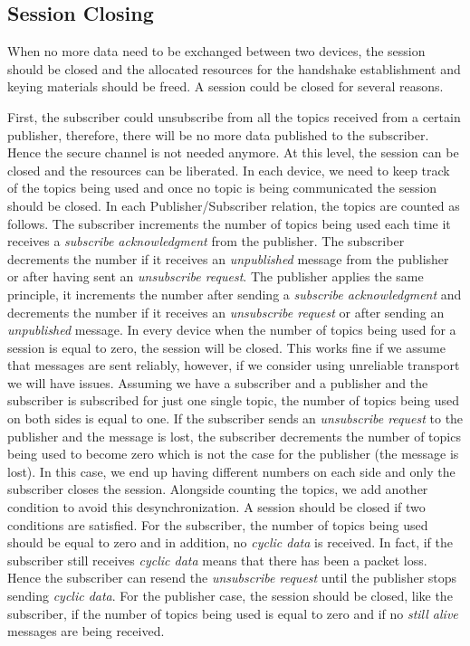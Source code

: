 \subsection{Session Closing}

When no more data need to be exchanged between two devices, the session should be closed and the allocated resources
for the handshake establishment and keying materials should be freed. A session could be closed for several reasons.

First, the subscriber could unsubscribe from all the topics received from a certain publisher, therefore, there will be no more
data published to the subscriber. Hence the secure channel is not needed anymore. At this level, the session can be closed and
the resources can be liberated. In each device, we need to keep track of the topics being used and once no topic is being communicated
the session should be closed. In each Publisher/Subscriber relation, the topics are counted as follows. The subscriber increments
the number of topics being used each time it receives a \textit{subscribe acknowledgment} from the publisher. The subscriber decrements the number
if it receives an \textit{unpublished} message from the publisher or after having sent an \textit{unsubscribe request}. The publisher applies
the same principle, it increments the number after sending a \textit{subscribe acknowledgment} and decrements the number if it receives
an \textit{unsubscribe request} or after sending an \textit{unpublished} message. In every device when the number of topics being used for a session is equal to
zero, the session will be closed. This works fine if we assume that messages are sent reliably, however, if we consider using unreliable
transport we will have issues. Assuming we have a subscriber and a publisher and the subscriber is subscribed for just one single topic,
the number of topics being used on both sides is equal to one. If the subscriber sends an \textit{unsubscribe request} to the publisher and the message is lost,
the subscriber decrements the number of topics being used to become zero which is not the case for the publisher (the message is lost).
In this case, we end up having different numbers on each side and only the subscriber closes the session. Alongside counting the topics,
we add another condition to avoid this desynchronization. A session should be closed if two conditions are satisfied.
For the subscriber, the number of topics being used should be equal to zero and in addition, no \textit{cyclic data} is received. In fact, if the
subscriber still receives \textit{cyclic data} means that there has been a packet loss. Hence the subscriber can resend the \textit{unsubscribe request} until the publisher
stops sending \textit{cyclic data}. For the publisher case, the session should be closed, like the subscriber, if the number of topics
being used is equal to zero and if no \textit{still alive} messages are being received.

